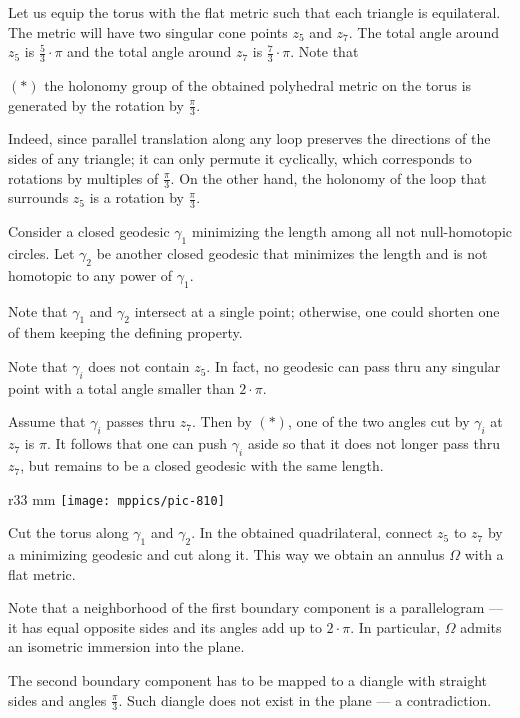 Let us equip the torus with the flat metric such that each triangle is equilateral.
The metric will have two singular cone points $z_5$ and $z_7$.
The total angle around $z_5$ is $\tfrac53\cdot\pi$
and the total angle around $z_7$ is $\tfrac73\cdot\pi$.
Note that

\begin{cl}{$({*})$}
the holonomy group of the obtained polyhedral metric on the torus is generated by the rotation by $\tfrac\pi3$.
\end{cl}

Indeed, since parallel translation along any loop preserves the directions of the sides of any triangle;
it can only permute it cyclically, which corresponds to rotations by multiples of $\tfrac\pi3$. 
On the other hand, the holonomy of the loop that surrounds $z_5$ is a rotation by $\tfrac\pi3$.

Consider a closed geodesic $\gamma_1$ minimizing the length among all not null-homotopic circles.
Let $\gamma_2$ be another closed geodesic that minimizes the length and is not homotopic to any power of $\gamma_1$.

Note that $\gamma_1$ and $\gamma_2$ intersect at a single point;
otherwise, one could shorten one of them keeping the defining property.

Note that $\gamma_i$ does not contain $z_5$.
In fact, no geodesic can pass thru any singular point with a total angle smaller than $2\cdot\pi$.

Assume that $\gamma_i$ passes thru $z_7$.
Then by $({*})$, one of the two angles cut by $\gamma_i$ at $z_7$ is $\pi$.
It follows that one can push $\gamma_i$ aside so that it does not longer pass thru $z_7$, but remains to be a closed geodesic with the same length.

\begin{wrapfigure}{r}{33 mm}
\vskip0mm
\centering
\texttt{[image: mppics/pic-810]}
\end{wrapfigure}

Cut the torus along $\gamma_1$ and $\gamma_2$.
In the obtained quadrilateral, connect $z_5$ to $z_7$ by a minimizing geodesic and cut along it.
This way we obtain an annulus $\Omega$ with a flat metric.

Note that a neighborhood of the first boundary component is a parallelogram --- it has equal opposite sides and its angles add up to $2\cdot \pi$.
In particular, $\Omega$ admits an isometric immersion into the plane.

The second boundary component has to be mapped to a diangle with straight sides and angles $\tfrac\pi3$.
Such diangle does not exist in the plane --- a contradiction.
\qeds

